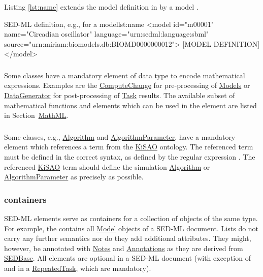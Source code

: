 Listing \ref{lst:name} extends the model definition in  by a model .

\begin{myXmlLst}{SED-ML  definition, e.g., for a model}{lst:name}
<model id="m00001" name="Circadian oscillator" language="urn:sedml:language:sbml" source="urn:miriam:biomodels.db:BIOMD0000000012">
	[MODEL DEFINITION]
</model>
\end{myXmlLst}


\subsubsection{}
\label{sec:math}
Some classes have a mandatory element  of data type \hyperref[type:mathml]{} to encode mathematical expressions. Examples are the \hyperref[class:computeChange]{ComputeChange} for pre-processing of \hyperref[class:model]{Models} or \hyperref[class:dataGenerator]{DataGenerator} for post-processing of \hyperref[class:task]{Task} results.
The available subset of mathematical functions and elements which can be used in the  element are listed in Section~\hyperref[sec:mathML]{MathML}.

\subsubsection{}
\label{sec:kisaoid}
Some classes, e.g., \hyperref[class:algorithm]{Algorithm} and \hyperref[class:algorithmParameter]{AlgorithmParameter}, have a mandatory element  which references a term from the \hyperref[sec:kisao]{KiSAO} ontology. The referenced term must be defined in the correct syntax, as defined by the regular expression . The referenced \hyperref[sec:kisao]{KiSAO} term  should define the simulation \hyperref[class:algorithm]{Algorithm} or \hyperref[class:algorithmParameter]{AlgorithmParameter} as precisely as possible.


\subsubsection{ containers}
\label{sec:listOf}
SED-ML  elements serve as containers for a collection of objects of the same type. For example, the \hyperref[sec:listOfModels]{} contains all \hyperref[class:model]{Model} objects of a SED-ML document. Lists do not carry any further semantics nor do they add additional attributes. They might, however, be annotated with \hyperref[class:notes]{Notes} and \hyperref[class:annotation]{Annotations} as they are derived from \hyperref[class:sedBase]{SEDBase}. All  elements are optional in a SED-ML document (with exception of \hyperref[sec:listOfRanges]{} and \hyperref[class:subTask]{} in a \hyperref[class:repeatedTask]{RepeatedTask}, which are mandatory).


